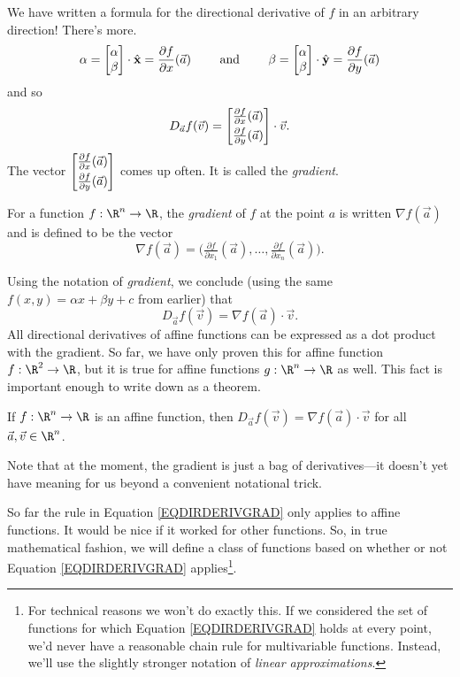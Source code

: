 We have written a formula for the directional derivative of $f$ in an arbitrary direction!  There's more.
\[
	\alpha = \mat{\alpha\\\beta}\cdot \xhat = \frac{\partial f}{\partial x}(\vec a)
	\qquad\text{ and }\qquad
	\beta = \mat{\alpha\\\beta}\cdot \yhat = \frac{\partial f}{\partial y}(\vec a)
\]
and so
\[
	D_{\vec a}f(\vec v) = \mat{\tfrac{\partial f}{\partial x}(\vec a)\\[3pt]\tfrac{\partial f}{\partial y}(\vec a)}
	\cdot \vec v.
\]
The vector $\mat{\tfrac{\partial f}{\partial x}(\vec a)\\[3pt]\tfrac{\partial f}{\partial y}(\vec a)}$ comes up often.
It is called the \emph{gradient}.

\begin{definition}[Gradient]
	For a function $f:\R^n\to\R$, the \emph{gradient} of $f$ at the point $a$ is
	written $\nabla f(\vec a)$ and is defined to be the vector
	\[
		\nabla f(\vec a) = \Big(\tfrac{\partial f}{\partial x_1}(\vec a),
		\ldots, \tfrac{\partial f}{\partial x_n}(\vec a) \Big).
	\]
\end{definition}

Using the notation of \emph{gradient}, 
we conclude (using the same $f(x,y)=\alpha x+\beta y+c$ from earlier) that
\begin{equation}
	\label{EQDIRDERIVGRAD}
	D_{\vec a}f(\vec v) = \nabla f(\vec a)\cdot \vec v.
\end{equation}
All directional derivatives of affine functions can be expressed as a dot product with
the gradient.  So far, we have only proven this for
affine function $f:\R^2\to\R$, but it is true for affine functions
$g:\R^n\to\R$ as well.  This fact is important enough to write down
as a theorem.

\begin{theorem}
	\label{THMAFFINEDERIV}
	If $f:\R^n\to\R$ is an affine function, then
	$
		D_{\vec a}f(\vec v) = \nabla f(\vec a)\cdot \vec v
	$
	for all $\vec a,\vec v\in\R^n$.
\end{theorem}

Note that at the moment, the gradient is just a bag of derivatives---it
doesn't yet have meaning for us beyond a convenient notational trick.

So far the rule in Equation \eqref{EQDIRDERIVGRAD} only applies to affine functions.
It would be nice if it worked for other functions.  So, in true mathematical
fashion, we will define a class of functions based on whether or not Equation
\eqref{EQDIRDERIVGRAD} applies\footnote{ For technical reasons we won't do exactly this.
If we considered the set of functions for which Equation \eqref{EQDIRDERIVGRAD}
holds at every point, we'd never have a reasonable chain rule for multivariable
functions.  Instead, we'll use the slightly stronger notation of \emph{linear approximations}.}.

